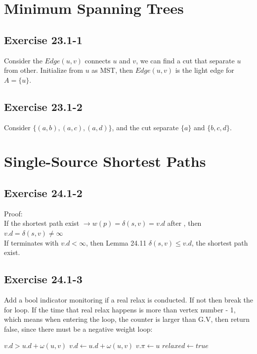 \documentclass[]{article}
\begin{document}
\section{Minimum Spanning Trees}

\subsection{Exercise 23.1-1}
Consider the $Edge(u,v)$ connects $u$ and $v$, we can find a cut that separate $u$ from other. Initialize from $u$ as MST, then $Edge(u,v)$ is the light edge for $A=\{u\}$.

\subsection{Exercise 23.1-2}
Consider $\{(a,b), (a,c), (a,d)\}$, and the cut separate $\{a\}$ and $\{b,c,d\}$.

\section{Single-Source Shortest Paths}

\subsection{Exercise 24.1-2}
Proof:\\
If the shortest path exist $\rightarrow w(p) = \delta(s,v) = v.d$ after , then $v.d = \delta(s,v) \neq \infty$\\
If  terminates with $v.d < \infty$, then Lemma 24.11 $\delta(s, v) \le v.d$, the shortest path exist.

\subsection{Exercise 24.1-3}

Add a bool indicator monitoring if a real relax is conducted. If not then break the for loop. If the time that real relax happens is more than vertex number - 1, which means when entering the loop, the counter is larger than G.V, then return false, since there must be a negative weight loop:

\begin{codebox}
	\li \If $v.d > u.d + \omega(u,v)$
	\li \Then $v.d \leftarrow u.d + \omega(u,v)$
	\li $v.\pi \leftarrow u$
	\li $relaxed \leftarrow true$
\end{codebox}
\end{document}
